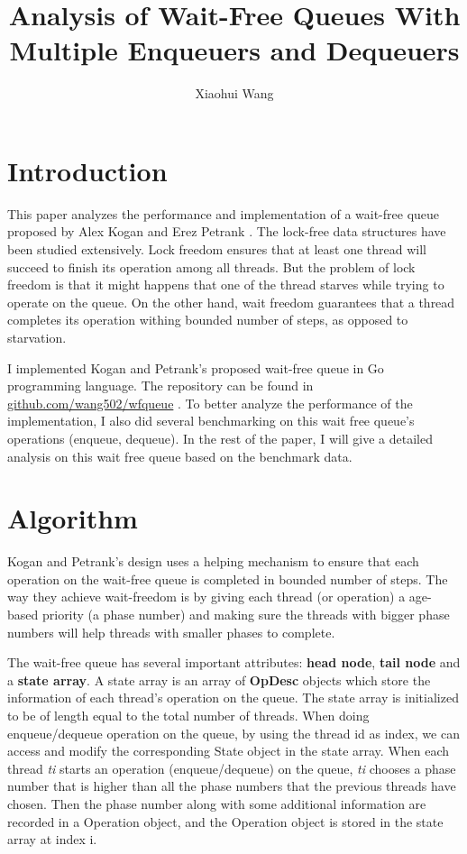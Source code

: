 \documentclass[a4paper]{article}
\title{Analysis of Wait-Free Queues With Multiple Enqueuers and Dequeuers}
\author{Xiaohui Wang}
\begin{document}
\maketitle

\section{Introduction}

This paper analyzes the performance and implementation of a wait-free queue proposed by Alex Kogan and Erez Petrank \cite{1}. The lock-free data structures have been studied extensively. Lock freedom ensures that at least one thread will succeed to finish its operation among all threads. But the problem of lock freedom is that it might happens that one of the thread starves while trying to operate on the queue. On the other hand, wait freedom guarantees that a thread completes its operation withing bounded number of steps, as opposed to starvation. 

I implemented Kogan and Petrank's proposed wait-free queue in Go programming language. The repository can be found in \href{Wait-free queue}{github.com/wang502/wfqueue} . To better analyze the performance of the implementation, I also did several benchmarking on this wait free queue's operations (enqueue, dequeue). In the rest of the paper, I will give a detailed analysis on this wait free queue based on the benchmark data.
\section{Algorithm}

Kogan and Petrank's design uses a helping mechanism to ensure that each operation on the wait-free queue is completed in bounded number of steps. The way they achieve wait-freedom is by giving each thread (or operation) a age-based priority (a phase number) and making sure the threads with bigger phase numbers will help threads with smaller phases to complete. 

The wait-free queue has several important attributes: \textbf{head node}, \textbf{tail node} and a \textbf{state array}. A state array is an array of \textbf{OpDesc} objects which store the information of each thread's operation on the queue. The state array is initialized to be of length equal to the total number of threads. When doing enqueue/dequeue operation on the queue, by using the thread id as index, we can access and modify the corresponding State object in the state array. When each thread \textit{ti} starts an operation (enqueue/dequeue) on the queue, \textit{ti} chooses a phase number that is higher than all the phase numbers that the previous threads have chosen. Then the phase number along with some additional information are recorded in a Operation object, and the Operation object is stored in the state array at index i. 
\end{document}
